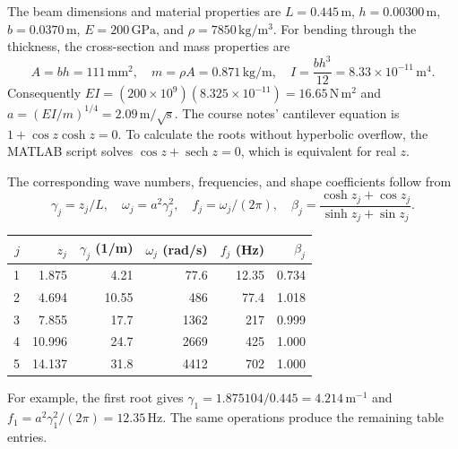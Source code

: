 The beam dimensions and material properties are \(L=0.445\,\mathrm m\), \(h=0.00300\,\mathrm m\), \(b=0.0370\,\mathrm m\), \(E=200\,\mathrm{GPa}\), and \(\rho=7850\,\mathrm{kg/m^3}\). For bending through the thickness, the cross-section and mass properties are
\[
A=bh=111\,\mathrm{mm^2},\quad
m=\rho A=0.871\,\mathrm{kg/m},\quad
I=\frac{bh^3}{12}=8.33\times10^{-11}\,\mathrm{m^4}.
\]
Consequently \(EI=(200\times10^9)(8.325\times10^{-11})=16.65\,\mathrm{N\,m^2}\) and \(a=(EI/m)^{1/4}=2.09\,\mathrm{m/\sqrt{s}}\). The course notes' cantilever equation is \(1+\cos z\cosh z=0\). To calculate the roots without hyperbolic overflow, the MATLAB script solves \(\cos z+\operatorname{sech}z=0\), which is equivalent for real \(z\).

The corresponding wave numbers, frequencies, and shape coefficients follow from
\[
\gamma_j=z_j/L,\quad \omega_j=a^2\gamma_j^2,\quad f_j=\omega_j/(2\pi),\quad
\beta_j=\frac{\cosh z_j+\cos z_j}{\sinh z_j+\sin z_j}.
\]
\begin{center}\small
\begin{tabular}{rrrrrr}
\toprule
$j$ & $z_j$ & $\gamma_j$ (1/m) & $\omega_j$ (rad/s) & $f_j$ (Hz) & $\beta_j$\\
\midrule
1&1.875&4.21&77.6&12.35&0.734\\
2&4.694&10.55&486&77.4&1.018\\
3&7.855&17.7&1362&217&0.999\\
4&10.996&24.7&2669&425&1.000\\
5&14.137&31.8&4412&702&1.000\\
\bottomrule
\end{tabular}
\end{center}
For example, the first root gives \(\gamma_1=1.875104/0.445=4.214\,\mathrm{m^{-1}}\) and \(f_1=a^2\gamma_1^2/(2\pi)=12.35\,\mathrm{Hz}\). The same operations produce the remaining table entries.

